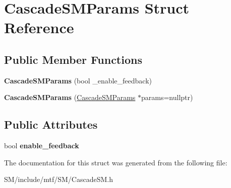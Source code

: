 \hypertarget{structCascadeSMParams}{\section{Cascade\-S\-M\-Params Struct Reference}
\label{structCascadeSMParams}
}
\subsection*{Public Member Functions}
\begin{DoxyCompactItemize}
\item 
\hypertarget{structCascadeSMParams_aa21a4664311dc87681bf969a0b5468e6}{{\bfseries Cascade\-S\-M\-Params} (bool \-\_\-enable\-\_\-feedback)}\label{structCascadeSMParams_aa21a4664311dc87681bf969a0b5468e6}

\item 
\hypertarget{structCascadeSMParams_a1db1a7b206fea69c9bdbe42936a6ad97}{{\bfseries Cascade\-S\-M\-Params} (\hyperlink{structCascadeSMParams}{Cascade\-S\-M\-Params} $\ast$params=nullptr)}\label{structCascadeSMParams_a1db1a7b206fea69c9bdbe42936a6ad97}

\end{DoxyCompactItemize}
\subsection*{Public Attributes}
\begin{DoxyCompactItemize}
\item 
\hypertarget{structCascadeSMParams_a9eed3f342f28393d98836a2a1fae0d41}{bool {\bfseries enable\-\_\-feedback}}\label{structCascadeSMParams_a9eed3f342f28393d98836a2a1fae0d41}

\end{DoxyCompactItemize}


The documentation for this struct was generated from the following file\-:\begin{DoxyCompactItemize}
\item 
S\-M/include/mtf/\-S\-M/Cascade\-S\-M.\-h\end{DoxyCompactItemize}
